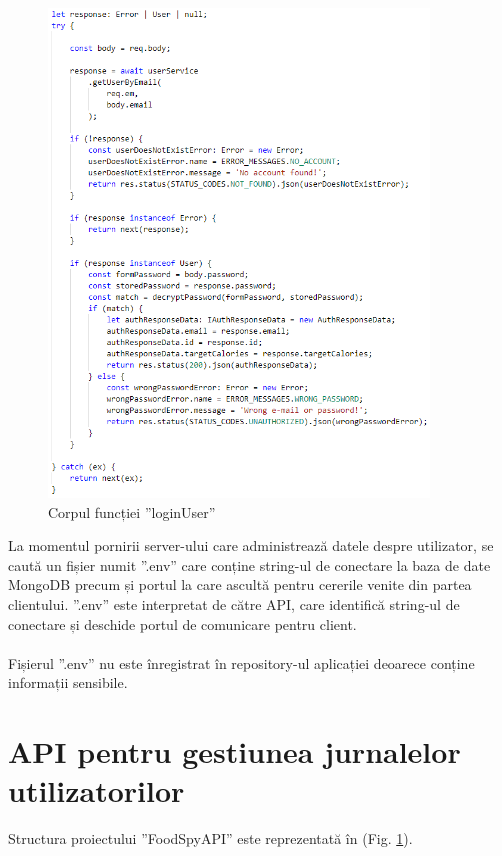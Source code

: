 \begin{figure}[!htb]
	\centering
	\includegraphics[width=0.9\textwidth]
	{../LaTeX/Images/userapi_loginuser.PNG}
	\caption{Corpul funcției ”loginUser”}
	\label{fig:616}
\end{figure}

La momentul pornirii server-ului care administrează datele despre utilizator, se caută un fișier numit ”.env” care conține string-ul de conectare la baza de date MongoDB precum și portul la care ascultă pentru cererile venite din partea clientului. ”.env” este interpretat de către API, care identifică string-ul de conectare și deschide portul de comunicare pentru client.
\\ \\
Fișierul ”.env” nu este înregistrat în repository-ul aplicației deoarece conține informații sensibile.


\section{API pentru gestiunea jurnalelor utilizatorilor}
Structura proiectului ”FoodSpyAPI” este reprezentată în (Fig. \ref{fig:616}).

